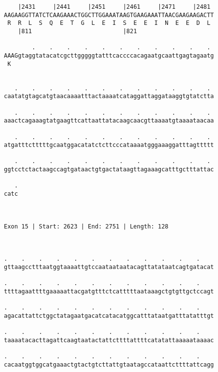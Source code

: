 \documentclass{article}
\begin{document}
\begin{Verbatim}
    |2431     |2441     |2451     |2461     |2471     |2481 
AAGAAGGTTATCTCAAGAAACTGGCTTGGAAATAAGTGAAGAAATTAACGAAGAAGACTT
 R  R  L  S  Q  E  T  G  L  E  I  S  E  E  I  N  E  E  D  L 
    |811                          |821                      
  
        .    .    .    .    .    .    .    .    .    .    . 
AAAGgtaggtatacatcgcttgggggtatttcaccccacagaatgcaattgagtagaatg
 K                                                          
                                                            
  
   .    .    .    .    .    .    .    .    .    .    .    . 
caatatgtagcatgtaacaaaatttactaaaatcataggattaggataaggtgtatctta
                                                            
   .    .    .    .    .    .    .    .    .    .    .    . 
aaactcagaaagtatgaagttcattaattatacaagcaacgttaaaatgtaaaataacaa
                                                            
   .    .    .    .    .    .    .    .    .    .    .    . 
atgatttctttttgcaatggacatatctcttcccataaaatgggaaaggatttagttttt
                                                            
   .    .    .    .    .    .    .    .    .    .    .    . 
ggtcctctactaagccagtgataactgtgactataagttagaaagcatttgctttattac
                                                            
   .
catc
    
    
 
Exon 15 | Start: 2623 | End: 2751 | Length: 128



.    .    .    .    .    .    .    .    .    .    .    .    
gttaagcctttaatggtaaaattgtccaataataatacagttatataatcagtgatacat
                                                            
.    .    .    .    .    .    .    .    .    .    .    .    
ttttagaattttgaaaaattacgatgtttctcatttttaataaagctgtgttgctccagt
                                                            
.    .    .    .    .    .    .    .    .    .    .    .    
agacattattctggctatagaatgacatcatacatggcatttataatgatttatatttgt
                                                            
.    .    .    .    .    .    .    .    .    .    .    .    
taaaatacacttagattcaagtaatactattcttttattttcatatattaaaaataaaac
                                                            
.    .    .    .    .    .    .    .    .    .    .    .    
cacaatggtggcatgaaactgtactgtcttattgtaatagccataattcttttattcagg
                                                            

\end{Verbatim}
\end{document}
